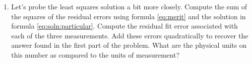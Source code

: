 \clearpage

\begin{enumerate}
\item Let's probe the least squares solution a bit more closely.
\subitem Compute the sum of the squares of the residual errors using formula \eqref{eq:merit} and the solution in formula \eqref{eq:soln:particular}. 
\subitem Compute the residual fit error associated with each of the three measurements.
\subitem Add these errors quadratically to recover the answer found in the first part of the problem. 
\subitem What are the physical units on this number as compared to the units of measurement?
\end{enumerate}

\endinput